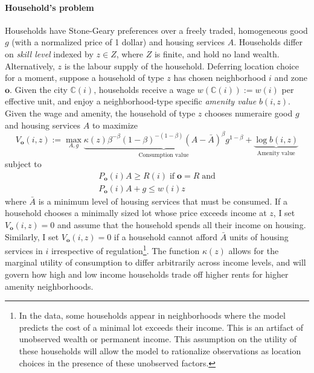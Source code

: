 \documentclass[12pt]{article}
\begin{document}
	\paragraph*{Household's problem}
	Households have Stone-Geary preferences over a freely traded, homogeneous good $g$ (with a normalized price of 1 dollar) and housing services $A$. Households differ on \textit{skill level} indexed by $z \in Z$, where $Z$ is finite, and hold no land wealth. Alternatively, $z$ is the labour supply of the household. Deferring location choice for a moment, suppose a household of type $z$ has chosen neighborhood $i$ and zone $\boldsymbol{o}$. Given the city $\mathbb{C}(i)$, households receive a wage $w(\mathbb{C}(i)) := w(i)$ per effective unit, and enjoy a neighborhood-type specific \textit{amenity value} $b(i, z)$. Given the wage and amenity, the household of type $z$ chooses numeraire good $g$ and housing services $A$ to maximize
	\begin{equation}\label{utility}
	V_{\boldsymbol{o}}(i, z) := \max_{A, g} \underbrace{\kappa(z)\beta^{-\beta}(1-\beta)^{-(1-\beta)}(A - \bar{A})^{\beta}g^{1-\beta}}_{\text{Consumption value}} + \underbrace{\log b(i, z)}_{\text{Amenity value}}
	\end{equation} 
	subject to
	\begin{eqnarray*}
		P_{\boldsymbol{o}}(i)A \geq R(i) \; \text{if} \; \boldsymbol{o} = R \; \text{and} \\
		P_{\boldsymbol{o}}(i)A + g \leq w(i)z
	\end{eqnarray*}
	where $\bar{A}$ is a minimum level of housing services that must be consumed. If a household chooses a minimally sized lot whose price exceeds income at $z$, I set  $V_{\boldsymbol{o}}(i, z) = 0$ and assume that the household spends all their income on housing. Similarly, I set $V_{\boldsymbol{o}}(i, z) = 0$ if a household cannot afford $\bar{A}$ units of housing services in $i$ irrespective of regulation\footnote{In the data, some households appear in neighborhoods where the model predicts the cost of a minimal lot exceeds their income. This is an artifact of unobserved wealth or permanent income. This assumption on the utility of these households will allow the model to rationalize observations as location choices in the presence of these unobserved factors.}. The function $\kappa(z)$ allows for the marginal utility of consumption to differ arbitrarily across income levels, and will govern how high and low income households trade off higher rents for higher amenity neighborhoods. 
	
\end{document}

